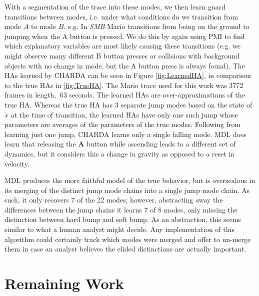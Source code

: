 \documentclass[12pt]{report}
\begin{document}
With a segmentation of the trace into these modes, we then learn guard transitions between modes, i.e. under what conditions do we transition from mode $A$ to mode $B$. e.g. In \textit{SMB} Mario transitions from being on the ground to jumping when the A button is pressed. We do this by again using PMI to find which explanatory variables are most likely causing these transitions (e.g. we might observe many different B button presses or collisions with background objects with no change in mode, but the A button press is always found). The HAs learned by CHARDA can be seen in Figure \ref{fig:LearnedHA}, in comparison to the true HAs in \ref{fig:TrueHA}.  The Mario trace used for this work was 3772 frames in length, $~63$ seconds.  The learned HAs are over-approximations of the true HA.  Whereas the true HA has 3 separate jump modes based on the state of $\dot{x}$ at the time of transition, the learned HAs have only one such jump whose parameters are averages of the parameters of the true modes.  Following from learning just one jump, CHARDA learns only a single falling mode.  MDL does learn that releasing the \textbf{A} button while ascending leads to a different set of dynamics, but it considers this a change in gravity as opposed to a reset in velocity.


MDL produces the more faithful model of the true behavior, but is overzealous in its merging of the distinct jump mode chains into a single jump mode chain. As such, it only recovers 7 of the 22 modes; however, abstracting away the differences between the jump chains it learns 7 of 8 modes, only missing the distinction between hard bump and soft bump. 
As an abstraction, this seems similar to what a human analyst might decide.
Any implementation of this algorithm could certainly track which modes were merged and offer to un-merge them in case an analyst believes the elided distinctions are actually important.
\section*{Remaining Work}
\end{document}
